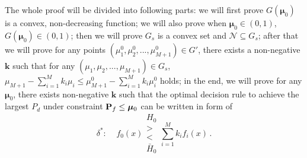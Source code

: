 \documentclass[12pt,journal,a4paper,twoside,onecolumn]{IEEEtran}
\newcommand{\rmnum}[1]{\romannumeral #1}
\begin{document}
\begin{spacing}{2.5}
The whole proof will be divided into following parts: we will first prove $G(\boldsymbol{\mu}_0)$ is a convex, non-decreasing function; we will also prove when $\boldsymbol{\mu}_0 \in (0, 1)$, $G(\boldsymbol{\mu}_0) \in (0, 1)$; then we will prove $G_s$ is a convex set and $\mathcal{N} \subseteq G_s$; after that we will prove for any points $(\mu_1^0, \mu_2^0, ..., \mu_{M+1}^0) \in G'$, there exists a non-negative $\mathbf{k}$ such that for any $(\mu_1, \mu_2, ..., \mu_{M+1}) \in G_s$, $\mu_{M+1} - \sum_{i=1}^{M}k_i\mu_i \leq \mu_{M+1}^0 - \sum_{i=1}^{M}k_i\mu_i^0$ holds;  in the end, we will prove for any $\boldsymbol{\mu}_0$, there exists non-negative $\mathbf{k}$ such that the optimal decision rule to achieve the largest $P_d$ under constraint $\mathbf{P}_f \leq \boldsymbol{\mu}_0$ can be written in form of 
\[
\delta^\ast:\;\;\;\;f_0(x) \substack{H_0 \\ > \\ < \\ \bar{H}_0} \sum_{i=1}^{M}k_if_i(x)\,.
\]

\end{spacing}
\end{document}
